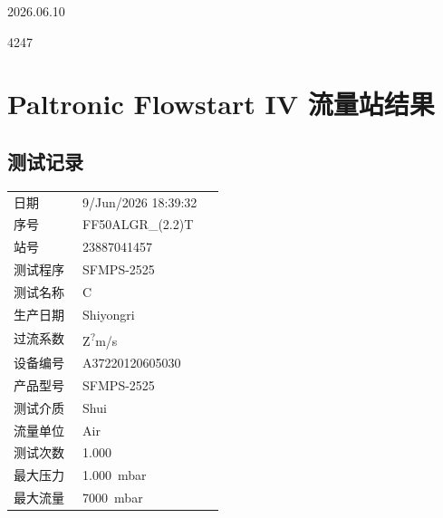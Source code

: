 \documentclass[UTF8,10pt,a4paper,fontset=fandol]{ctexart}
\newcommand{\fieldvalue}[1]{#1}
\newcommand{\handwritten}[1]{#1}
\begin{document}
\handwritten{2026.06.10}

\handwritten{4247}

\newpage

\section*{Paltronic Flowstart IV 流量站结果}

\subsection*{测试记录}

\begin{tabular}{@{}p{0.30\linewidth}p{0.62\linewidth}@{}}
日期 &
\fieldvalue{9/Jun/2026 18:39:32}
\\[2pt]
序号 &
\fieldvalue{FF50ALGR\_(2.2)T}
\\[2pt]
站号 &
\fieldvalue{23887041457}
\\[2pt]
测试程序 &
\fieldvalue{SFMPS-2525}
\\[2pt]
测试名称 &
\fieldvalue{C}
\\[2pt]
生产日期 &
\fieldvalue{Shiyongri}
\\[2pt]
过流系数 &
\fieldvalue{Z\textsuperscript{?}m/s}
\\[2pt]
设备编号 &
\fieldvalue{A37220120605030}
\\[2pt]
产品型号 &
\fieldvalue{SFMPS-2525}
\\[2pt]
测试介质 &
\fieldvalue{Shui}
\\[2pt]
流量单位 &
\fieldvalue{Air}
\\[2pt]
测试次数 &
\fieldvalue{1.000}
\\[2pt]
最大压力 &
\fieldvalue{1.000~mbar}
\\[2pt]
最大流量 &
\fieldvalue{7000~mbar}
\end{tabular}
\end{document}
